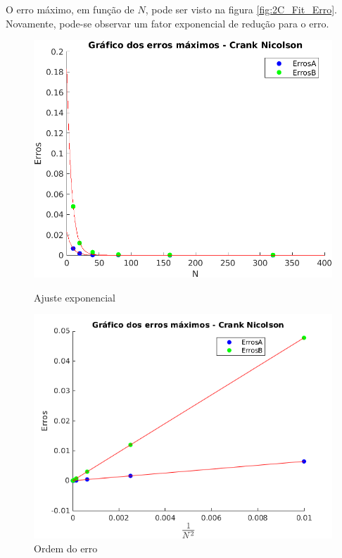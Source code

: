 \documentclass[12pt]{article}
\begin{document}
\begin{spacing}{1.5}
O erro máximo, em função de $N$, pode ser visto na figura \ref{fig:2C_Fit_Erro}. Novamente, pode-se observar um fator exponencial de redução para o erro.


\begin{figure}[ht!]
\centering
    \begin{minipage}[b]{0.45\linewidth}
    \includegraphics[width=0.95\linewidth]{Segunda_Tarefa/ItemC/erro_crank.png}
    \caption{Ajuste exponencial}
    \label{fig:2C_Fit_Erro}
\end{minipage}
\quad
\begin{minipage}[b]{0.45\linewidth}
    \includegraphics[width=1\linewidth]{Segunda_Tarefa/ItemC/ordem_erro.png}
    \caption{Ordem do erro}
    \label{fig:ordem_erro_CN}
\end{minipage}
\end{figure}


\end{spacing}
\end{document}
